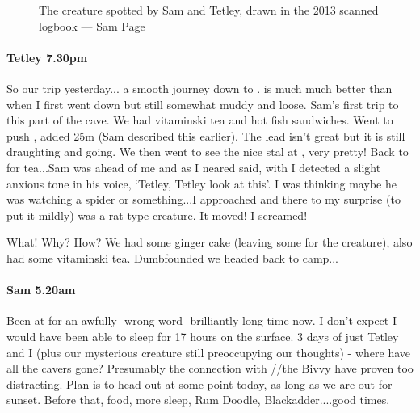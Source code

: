 \begin{figure}[t!]
	\checkoddpage \ifoddpage \forcerectofloat \else \forceversofloat \fi
	\centering
	\caption{The creature spotted by Sam and Tetley, drawn in the 2013 scanned logbook --- Sam Page}
	\label{the_creature}
\end{figure}


\paragraph{Tetley 7.30pm}

So our trip yesterday... a smooth journey down to .  is much much better than when I first went down but still somewhat muddy and loose. Sam's first trip to this part of the cave. We had vitaminski tea and hot fish sandwiches. Went to push , added 25m (Sam described this earlier). The lead isn't great but it is still draughting and going. We then went to see the nice stal at , very pretty! Back to  for tea...Sam was ahead of me and as I neared  said, with I detected a slight anxious tone in his voice, `Tetley, Tetley look at this'. I was thinking maybe he was watching a spider or something...I approached and there to my surprise (to put it mildly) was a rat type creature. It moved! I screamed!

What! Why? How? We had some ginger cake (leaving some for the creature), also had some vitaminski tea. Dumbfounded we headed back to camp...

\paragraph{Sam 5.20am}
Been at  for an awfully -wrong word- brilliantly long time now. I don't expect I would have been able to sleep for 17 hours on the surface. 3 days of just Tetley and I (plus our mysterious creature still preoccupying our thoughts) - where have all the cavers gone? Presumably the connection with //the Bivvy have proven too distracting. Plan is to head out at some point today, as long as we are out for sunset. Before that, food, more sleep, Rum Doodle, Blackadder....good times.

